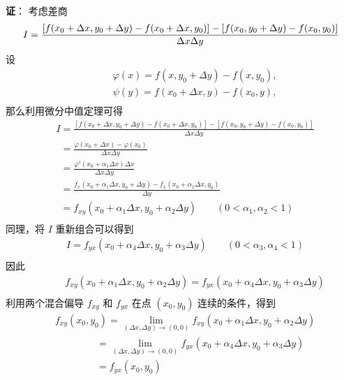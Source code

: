 \textbf{证}：
考虑差商
\begin{equation}
I=\frac{[f(x_0+\Delta x,y_0+\Delta y)-f(x_0+\Delta x,y_0)]-[f(x_0,y_0+\Delta y)-f(x_0,y_0)]}{\Delta x\Delta y}\\
\end{equation}
设
\begin{equation}
\begin{aligned} 
&\qquad\varphi(x)=f(x,y_0+\Delta y)-f(x,y_0),\\
&\qquad\psi(y)=f(x_0+\Delta x,y)-f(x_0,y),\\
\end{aligned}
\end{equation}
那么利用微分中值定理可得
\begin{equation}
\begin{aligned} 
&I=\frac{[f(x_0+\Delta x,y_0+\Delta y)-f(x_0+\Delta x,y_0)]-[f(x_0,y_0+\Delta y)-f(x_0,y_0)]}{\Delta x\Delta y}\\
&\ \ =\frac{\varphi(x_0+\Delta x)-\varphi(x_0)}{\Delta x\Delta y}\\
&\ \ =\frac{\varphi'(x_0+\alpha_1\Delta x)\Delta x}{\Delta x\Delta y}\\
&\ \ =\frac{f_x(x_0+\alpha_1\Delta x,y_0+\Delta y)-f_x(x_0+\alpha_1\Delta x,y_0)}{\Delta y}\\
&\ \ =f_{xy}(x_0+\alpha_1\Delta x,y_0+\alpha_2\Delta y)\qquad(0<\alpha_1,\alpha_2<1)\\
\end{aligned}
\end{equation}
同理，将 $I$ 重新组合可以得到
\begin{equation}
\begin{aligned} 
&I=f_{yx}(x_0+\alpha_4\Delta x,y_0+\alpha_3\Delta y)\qquad(0<\alpha_3,\alpha_4<1)\\
\end{aligned}
\end{equation}
因此
\begin{equation}
\begin{aligned} 
&\qquad f_{xy}(x_0+\alpha_1\Delta x,y_0+\alpha_2\Delta y)=f_{yx}(x_0+\alpha_4\Delta x,y_0+\alpha_3\Delta y)\\
\end{aligned}
\end{equation}
利用两个混合偏导 $f_{xy}$ 和 $f_{yx}$ 在点 $(x_0,y_0)$ 连续的条件，得到
\begin{equation}
\begin{aligned} 
&f_{xy}(x_0,y_0)=\lim_{(\Delta x,\Delta y)\to(0,0)}f_{xy}(x_0+\alpha_1\Delta x,y_0+\alpha_2\Delta y)\\
&\qquad\qquad\ =\lim_{(\Delta x,\Delta y)\to(0,0)}f_{yx}(x_0+\alpha_4\Delta x,y_0+\alpha_3\Delta y)\\
&\qquad\qquad\ =f_{yx}(x_0,y_0)
\end{aligned}
\end{equation}









